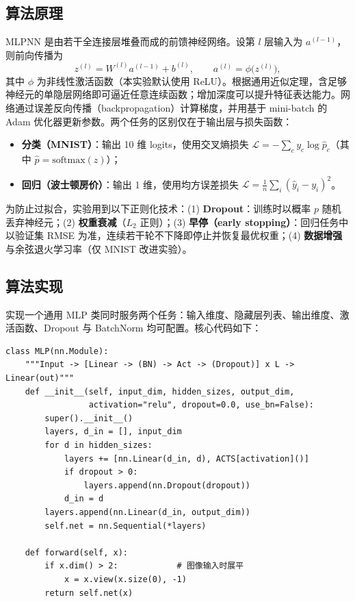 \documentclass[UTF8,zihao=-4]{ctexart}
\begin{document}
\subsection{算法原理}
MLPNN 是由若干全连接层堆叠而成的前馈神经网络。设第 $l$ 层输入为 $a^{(l-1)}$，则前向传播为
\[
  z^{(l)} = W^{(l)} a^{(l-1)} + b^{(l)}, \qquad a^{(l)} = \phi\big(z^{(l)}\big),
\]
其中 $\phi$ 为非线性激活函数（本实验默认使用 ReLU）。根据通用近似定理，含足够神经元的单隐层网络即可逼近任意连续函数；增加深度可以提升特征表达能力。网络通过误差反向传播（backpropagation）计算梯度，并用基于 mini-batch 的 Adam 优化器更新参数。两个任务的区别仅在于输出层与损失函数：
\begin{itemize}
  \item \textbf{分类（MNIST）}：输出 10 维 logits，使用交叉熵损失 $\mathcal{L}=-\sum_c y_c\log\hat p_c$（其中 $\hat p = \mathrm{softmax}(z)$）；
  \item \textbf{回归（波士顿房价）}：输出 1 维，使用均方误差损失 $\mathcal{L}=\frac{1}{n}\sum_i(\hat y_i - y_i)^2$。
\end{itemize}
为防止过拟合，实验用到以下正则化技术：(1) \textbf{Dropout}：训练时以概率 $p$ 随机丢弃神经元；(2) \textbf{权重衰减}（$L_2$ 正则）；(3) \textbf{早停（early stopping）}：回归任务中以验证集 RMSE 为准，连续若干轮不下降即停止并恢复最优权重；(4) \textbf{数据增强}与余弦退火学习率（仅 MNIST 改进实验）。

\subsection{算法实现}
实现一个通用 MLP 类同时服务两个任务：输入维度、隐藏层列表、输出维度、激活函数、Dropout 与 BatchNorm 均可配置。核心代码如下：

\begin{lstlisting}
class MLP(nn.Module):
    """Input -> [Linear -> (BN) -> Act -> (Dropout)] x L -> Linear(out)"""
    def __init__(self, input_dim, hidden_sizes, output_dim,
                 activation="relu", dropout=0.0, use_bn=False):
        super().__init__()
        layers, d_in = [], input_dim
        for d in hidden_sizes:
            layers += [nn.Linear(d_in, d), ACTS[activation]()]
            if dropout > 0:
                layers.append(nn.Dropout(dropout))
            d_in = d
        layers.append(nn.Linear(d_in, output_dim))
        self.net = nn.Sequential(*layers)

    def forward(self, x):
        if x.dim() > 2:            # 图像输入时展平
            x = x.view(x.size(0), -1)
        return self.net(x)
\end{lstlisting}
\end{document}
